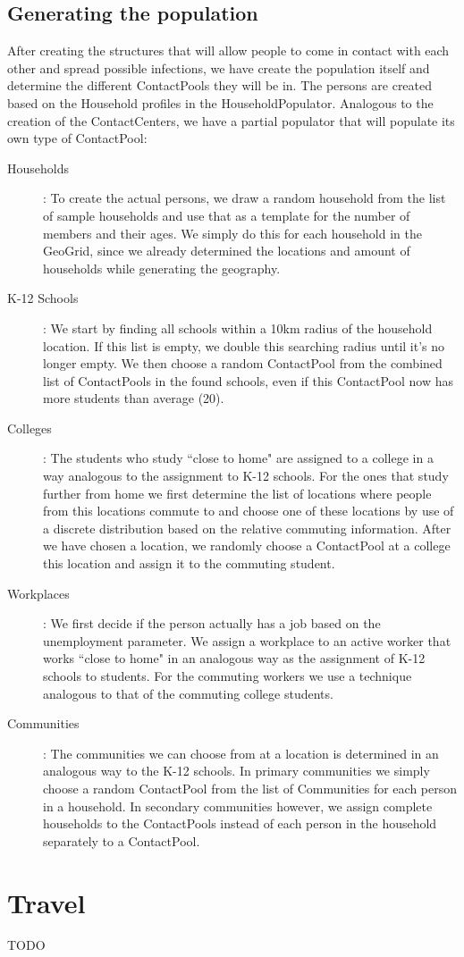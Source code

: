 \subsection{Generating the population}
\label{subsection:genpop}
After creating the structures that will allow people to come in contact with each other and spread possible infections, we have create the population itself and determine the different ContactPools they will be in.
The persons are created based on the Household profiles in the HouseholdPopulator.
Analogous to the creation of the ContactCenters, we have a partial populator that will populate its own type of ContactPool:

\begin{description}
    \item[Households]:
        To create the actual persons, we draw a random household from the list of sample households and use that as a template for the number of members and their ages.
        We simply do this for each household in the GeoGrid, since we already determined the locations and amount of households while generating the geography.
    \item[K-12 Schools]:
        We start by finding all schools within a 10km radius of the household location. If this list is empty, we double this searching radius until it's no longer empty.
        We then choose a random ContactPool from the combined list of ContactPools in the found schools, even if this ContactPool now has more students than average (20).
    \item[Colleges]:
        The students who study ``close to home" are assigned to a college in a way analogous to the assignment to K-12 schools.
        For the ones that study further from home we first determine the list of locations where people from this locations commute to and choose one of these locations by use of a discrete distribution based on the relative commuting information.
        After we have chosen a location, we randomly choose a ContactPool at a college this location and assign it to the commuting student.
    \item[Workplaces]:
        We first decide if the person actually has a job based on the unemployment parameter.
        We assign a workplace to an active worker that works ``close to home" in an analogous way as the assignment of K-12 schools to students.
        For the commuting workers we use a technique analogous to that of the commuting college students.
    \item[Communities]:
        The communities we can choose from at a location is determined in an analogous way to the K-12 schools.
        In primary communities we simply choose a random ContactPool from the list of Communities for each person in a household.
        In secondary communities however, we assign complete households to the ContactPools instead of each person in the household separately to a ContactPool.

\end{description}


\section{Travel}
\label{section:travel}
TODO
